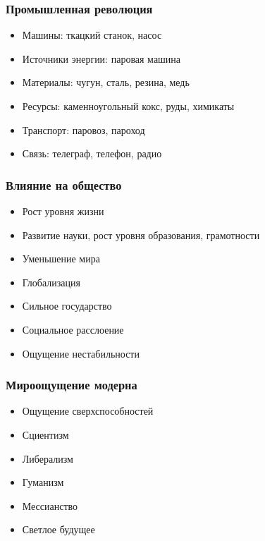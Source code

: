\documentclass[aspectratio=169]{beamer}
\begin{document}
\begin{bframe}\frametitle{Промышленная революция}
\begin{itemize}
\item<1-> Машины: ткацкий станок, насос
\item<3-> Источники энергии: паровая машина
\item<5-> Материалы: чугун, сталь, резина, медь
\item<6-> Ресурсы: каменноугольный кокс, руды, химикаты
\item<7-> Транспорт: паровоз, пароход
\item<9-> Связь: телеграф, телефон, радио
\end{itemize}
\end{bframe}

\begin{bframe}\frametitle{Влияние на общество}
\begin{itemize}
\item<+-> Рост уровня жизни
\item<+-> Развитие науки, рост уровня образования, грамотности
\item<+-> Уменьшение мира
\item<+-> Глобализация
\item<+-> Сильное государство
\item<+-> Социальное расслоение
\item<+-> Ощущение нестабильности
\end{itemize}
\end{bframe}

\begin{bframe}\frametitle{Мироощущение модерна}
\begin{itemize}
\item<+-> Ощущение сверхспособностей
\item<+-> Сциентизм
\item<+-> Либерализм
\item<+-> Гуманизм
\item<+-> Мессианство
\item<+-> Светлое будущее
\end{itemize}
\end{bframe}
\end{document}
